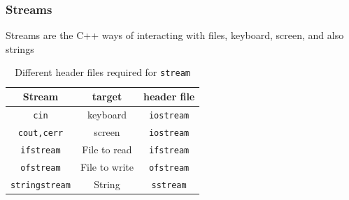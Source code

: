 \documentclass{beamer}
\begin{document}
\begin{frame}[fragile]
\frametitle{Streams}
Streams are the C++ ways of interacting with files, 
keyboard, screen, and also strings
\begin{table}
\begin{tabular}{|c|c|c|}
\hline 
 \textbf{Stream} & \textbf{target} & \textbf{header file} \\ 
\hline 
\texttt{cin} & keyboard & \texttt{iostream} \\ 
\hline 
\texttt{cout,cerr} & screen & \texttt{iostream} \\ 
\hline 
\texttt{ifstream} & File to read & \texttt{ifstream} \\ 
\hline 
\texttt{ofstream} & File to write & \texttt{ofstream} \\ 
\hline 
\texttt{stringstream} & String & \texttt{sstream} \\ 
\hline 
\end{tabular}

\caption{Different header files required for \texttt{stream}}

\end{table}


\end{frame}
\end{document}
